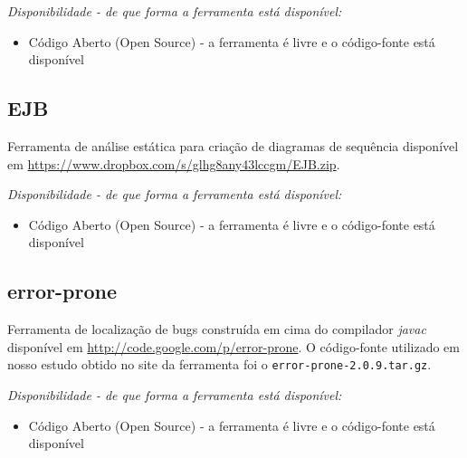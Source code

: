 \begin{description}

  \item {\it Disponibilidade - de que forma a ferramenta está disponível:}
    \begin{itemize}
      \item Código Aberto (Open Source) - a ferramenta é livre e o código-fonte está disponível
    \end{itemize}

\end{description}

\subsection{EJB}

Ferramenta de análise estática para criação de diagramas de sequência
disponível em
\url{https://www.dropbox.com/s/glhg8any43lccgm/EJB.zip}.

\begin{description}

  \item {\it Disponibilidade - de que forma a ferramenta está disponível:}
    \begin{itemize}
      \item Código Aberto (Open Source) - a ferramenta é livre e o código-fonte está disponível
    \end{itemize}

\end{description}

\subsection{error-prone}

Ferramenta de localização de bugs construída em cima do
compilador {\it javac} disponível em
\url{http://code.google.com/p/error-prone}. O código-fonte utilizado em nosso
estudo obtido no site da ferramenta foi o \texttt{error-prone-2.0.9.tar.gz}.

\begin{description}

  \item {\it Disponibilidade - de que forma a ferramenta está disponível:}
    \begin{itemize}
      \item Código Aberto (Open Source) - a ferramenta é livre e o código-fonte está disponível
    \end{itemize}

\end{description}

